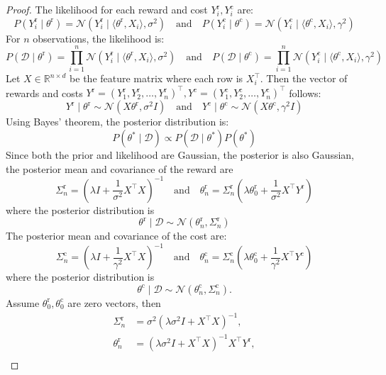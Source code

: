 \documentclass[accepted]{uai2025} %
\theoremstyle{plain}
\theoremstyle{definition}
\theoremstyle{remark}
\newcommand{\thetac}{\theta^{\mathrm{c}}}
\newcommand{\thetar}{\theta^{\mathrm{r}}}
\begin{document}
\begin{proof}
The likelihood for each reward and cost $Y^{\mathrm{r}}_i, Y^{\mathrm{c}}_i$ are:
\[
P(Y^{\mathrm{r}}_i \mid \thetar) = \mathcal{N}(Y_i^{\mathrm{r}} \mid \langle{\thetar}, X_i \rangle, \sigma^2)
\quad\mbox{and}\quad
P(Y^{\mathrm{c}}_i \mid \thetac) = \mathcal{N}(Y_i^{\mathrm{c}} \mid \langle{\thetac}, X_i \rangle, \gamma^2)
\]
For $n$ observations, the likelihood is:
\[
P(\mathcal{D} \mid \thetar) = \prod_{i=1}^n \mathcal{N}(Y^{\mathrm{r}}_i \mid\langle{\thetar}, X_i \rangle, \sigma^2)
\quad\mbox{and}\quad
P(\mathcal{D} \mid \thetac) = \prod_{i=1}^n \mathcal{N}(Y^{\mathrm{c}}_i \mid\langle{\thetac}, X_i \rangle, \gamma^2)
\]
Let $X \in \mathbb{R}^{n \times d}$ be the feature matrix where each row is $X_i^\top$. Then the vector of rewards and costs $Y^{\mathrm{r}} = (Y^{\mathrm{r}}_1, Y^{\mathrm{r}}_2, \ldots, Y^{\mathrm{r}}_n)^\top, Y^{\mathrm{c}} = (Y^{\mathrm{c}}_1, Y^{\mathrm{c}}_2, \ldots, Y^{\mathrm{c}}_n)^\top$ follows:
\[
Y^{\mathrm{r}} \mid \thetar \sim \mathcal{N}(X \thetar, \sigma^2 I)
\quad\mbox{and}\quad
Y^{\mathrm{c}} \mid \thetac \sim \mathcal{N}(X \thetac, \gamma^2 I)
\]
Using Bayes' theorem, the posterior distribution is:
\[
P(\theta^* \mid \mathcal{D}) \propto P(\mathcal{D} \mid \theta^*) P(\theta^*)
\]
Since both the prior and likelihood are Gaussian, the posterior is also Gaussian, the posterior mean and covariance of the reward are
  \[
  \Sigma^{\mathrm{r}}_n = \left( \lambda I + \frac{1}{\sigma^2} X^\top X \right)^{-1}
\quad\mbox{and}\quad
  \theta^{\mathrm{r}}_n = \Sigma^{\mathrm{r}}_n \left( \lambda \theta^{\mathrm{r}}_0 + \frac{1}{\sigma^2} X^\top Y^{\mathrm{r}} \right)
  \]
where the posterior distribution is
\[
\thetar \mid \mathcal{D} \sim \mathcal{N}(\theta^{\mathrm{r}}_n, \Sigma^{\mathrm{r}}_n)
\]
The posterior mean and covariance of the cost are:
 \[
  \Sigma^{\mathrm{c}}_n = \left( \lambda I + \frac{1}{\gamma^2} X^\top X \right)^{-1}
\quad\mbox{and}\quad
  \theta^{\mathrm{c}}_n = \Sigma^{\mathrm{c}}_n \left( \lambda \theta^{\mathrm{c}}_0 + \frac{1}{\gamma^2} X^\top Y^{\mathrm{c}} \right)
  \]
 where the posterior distribution is
\[
\thetac \mid \mathcal{D} \sim \mathcal{N}(\theta^{\mathrm{c}}_n, \Sigma^{\mathrm{c}}_n).
\]
Assume $\theta^{\mathrm{r}}_0, \theta^{\mathrm{c}}_0$ are zero vectors, then 
\begin{align*}
    \Sigma^{\mathrm{r}}_n &=\sigma^2\left( \lambda \sigma^2 I +  X^\top X \right)^{-1},\\
    \theta^{\mathrm{r}}_n &= \left( \lambda \sigma^2 I +  X^\top X \right)^{-1}   X^\top Y^{\mathrm{r}} ,\\

\end{align*}
\end{proof}
\end{document}
